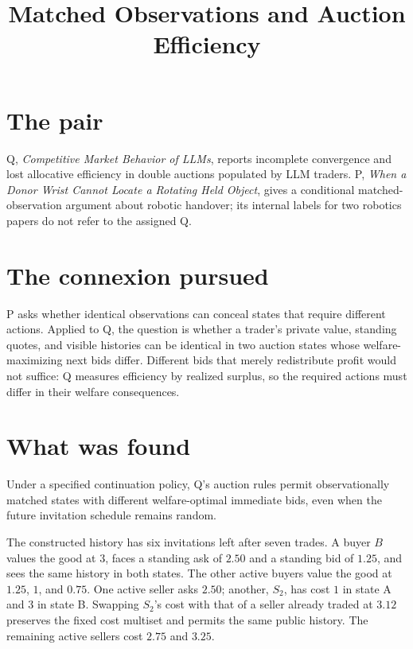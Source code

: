 \documentclass{article}
\title{Matched Observations and Auction Efficiency}
\begin{document}
\maketitle

\section{The pair}

Q, \emph{Competitive Market Behavior of LLMs}, reports incomplete convergence and lost allocative efficiency in double auctions populated by LLM traders. P, \emph{When a Donor Wrist Cannot Locate a Rotating Held Object}, gives a conditional matched-observation argument about robotic handover; its internal labels for two robotics papers do not refer to the assigned Q.

\section{The connexion pursued}

P asks whether identical observations can conceal states that require different actions. Applied to Q, the question is whether a trader's private value, standing quotes, and visible histories can be identical in two auction states whose welfare-maximizing next bids differ. Different bids that merely redistribute profit would not suffice: Q measures efficiency by realized surplus, so the required actions must differ in their welfare consequences.

\section{What was found}

\begin{claim}
Under a specified continuation policy, Q's auction rules permit observationally matched states with different welfare-optimal immediate bids, even when the future invitation schedule remains random.
\end{claim}

The constructed history has six invitations left after seven trades. A buyer \(B\) values the good at \(3\), faces a standing ask of \(2.50\) and a standing bid of \(1.25\), and sees the same history in both states. The other active buyers value the good at \(1.25\), \(1\), and \(0.75\). One active seller asks \(2.50\); another, \(S_2\), has cost \(1\) in state A and \(3\) in state B. Swapping \(S_2\)'s cost with that of a seller already traded at \(3.12\) preserves the fixed cost multiset and permits the same public history. The remaining active sellers cost \(2.75\) and \(3.25\).
\end{document}
